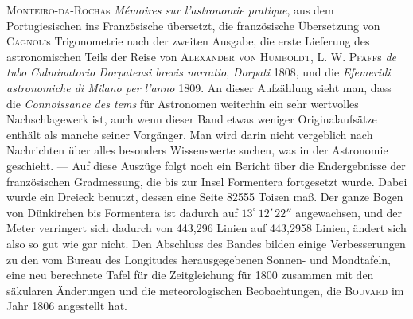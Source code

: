 \textsc{Monteiro-da-Rocha}s \emph{Mémoires sur l'astronomie pratique}, aus dem Portugiesischen ins Französische übersetzt, die französische Übersetzung von \textsc{Cagnoli}s Trigonometrie nach der zweiten Ausgabe, die erste Lieferung des astronomischen Teils der Reise von \textsc{Alexander von Humboldt}, \textsc{L. W. Pfaff}s \emph{de tubo Culminatorio Dorpatensi brevis narratio}, \emph{Dorpati} 1808, und die \emph{Efemeridi astronomiche di Milano per l'anno} 1809. An dieser Aufzählung sieht man, dass die \emph{Connoissance des tems} für Astronomen weiterhin ein sehr wertvolles Nachschlagewerk ist, auch wenn dieser Band etwas weniger Originalaufsätze enthält als manche seiner Vorgänger. Man wird darin nicht vergeblich nach Nachrichten über alles besonders Wissenswerte suchen, was in der Astronomie geschieht. — Auf diese Auszüge folgt noch ein Bericht über die Endergebnisse der französischen Gradmessung, die bis zur Insel Formentera fortgesetzt wurde. Dabei wurde ein Dreieck benutzt, dessen eine Seite 82555 Toisen maß. Der ganze Bogen von Dünkirchen bis Formentera ist dadurch auf $13^\circ\,12'\,22''$ angewachsen, und der Meter verringert sich dadurch von 443,296 Linien auf 443,2958 Linien, ändert sich also so gut wie gar nicht. Den Abschluss des Bandes bilden einige Verbesserungen zu den vom Bureau des Longitudes herausgegebenen Sonnen- und Mondtafeln, eine neu berechnete Tafel für die Zeitgleichung für 1800 zusammen mit den säkularen Änderungen und die meteorologischen Beobachtungen, die \textsc{Bouvard} im Jahr 1806 angestellt hat.
